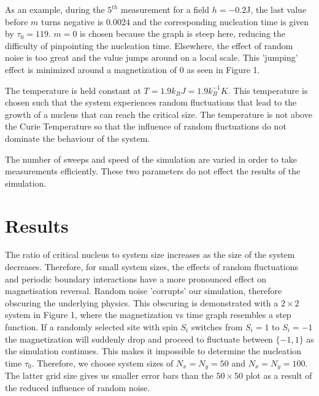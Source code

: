 \documentclass{article}
\begin{document}
\begin{multicols*}{2}
As an example, during the $5^{th}$ measurement for a field $h=-0.2$J, the last value before $m$ turns negative is $0.0024$ and the corresponding nucleation time is given by $\tau_{0}=119$. $m = 0$ is chosen because the graph is steep here, reducing the difficulty of pinpointing the nucleation time. Elsewhere, the effect of random noise is too great and the value jumps around on a local scale. This 'jumping' effect is minimized around a magnetization of 0 as seen in Figure 1.

The temperature is held constant at $T = 1.9k_{B} J = 1.9{k_{B}^{-1}}K$. This temperature is chosen such that the system experiences random fluctuations that lead to the growth of a nucleus that can reach the critical size. The temperature is not above the Curie Temperature so that the influence of random fluctuations do not dominate the behaviour of the system.

The number of sweeps and speed of the simulation are varied in order to take measurements efficiently. These two parameters do not effect the results of the simulation.

\maketitle
\section{Results}

The ratio of critical nucleus to system size increases as the size of the system decreases. Therefore, for small system sizes, the effects of random fluctuations and periodic boundary interactions have a more pronounced effect on magnetisation reversal. Random noise 'corrupts' our simulation, therefore obscuring the underlying physics. This obscuring is demonstrated with a $2 \times 2$ system in Figure 1, where the magnetization vs time graph resembles a step function. If a randomly selected site with spin $S_{i}$ switches from $S_{i}=1$ to $S_{i}=-1$ the magnetization will suddenly drop and proceed to fluctuate between $\{-1, 1\}$ as the simulation continues. This makes it impossible to determine the nucleation time $\tau_{0}$. Therefore, we choose system sizes of $N_{x} = N_{y} = 50$ and $N_{x} = N_{y} = 100$. The latter grid size gives us smaller error bars than the $50 \times 50$ plot as a result of the reduced influence of random noise.


\end{multicols*}
\end{document}

